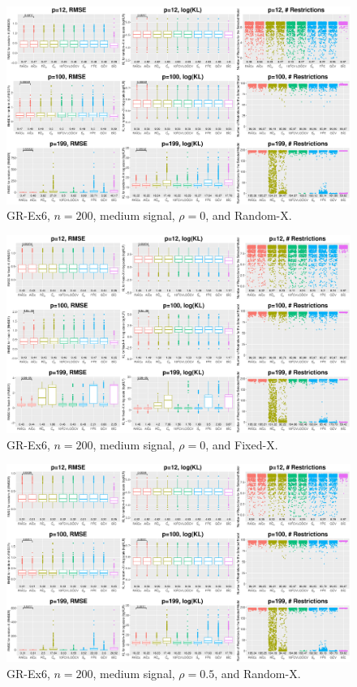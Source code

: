 \clearpage
\begin{figure}[!ht]
\centering
\includegraphics[width=\textwidth]{figures/supplement/randomx_GR-Ex6_n200_msnr_rho0.eps}
\caption{GR-Ex6, $n=200$, medium signal, $\rho=0$, and Random-X.}
\end{figure}
\begin{figure}[!ht]
\centering
\includegraphics[width=\textwidth]{figures/supplement/fixedx_GR-Ex6_n200_msnr_rho0.eps}
\caption{GR-Ex6, $n=200$, medium signal, $\rho=0$, and Fixed-X.}
\end{figure}
\clearpage
\begin{figure}[!ht]
\centering
\includegraphics[width=\textwidth]{figures/supplement/randomx_GR-Ex6_n200_msnr_rho05.eps}
\caption{GR-Ex6, $n=200$, medium signal, $\rho=0.5$, and Random-X.}
\end{figure}
